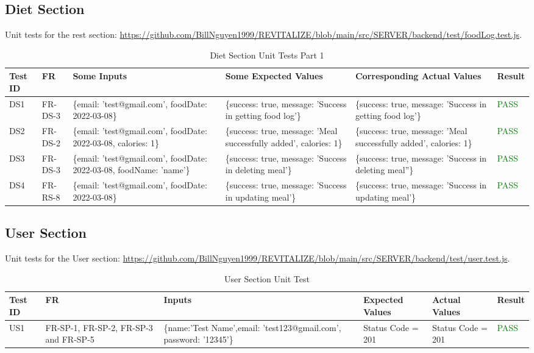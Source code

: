 \documentclass[12pt, titlepage]{article}
\begin{document}
\newpage

\subsection{Diet Section}

Unit tests for the rest section: \url{https://github.com/BillNguyen1999/REVITALIZE/blob/main/src/SERVER/backend/test/foodLog.test.js}.

\begin{table}[h]
\centering
\small
\begin{tabularx}{\textwidth}{|X|X|p{3cm}|p{2.5cm}|p{2.5cm}|X|}
	\hline
	Test ID & FR & Some Inputs & Some Expected Values & Corresponding Actual Values & Result \\
	\hline
	DS1 & FR-DS-3 & \{email: 'test@gmail.com', foodDate: 2022-03-08\}  & \{success: true, message: 'Success in getting food log'\} & \{success: true, message: 'Success in getting food log'\} & \textcolor{Green}{PASS} \\
	\hline
	DS2 & FR-DS-2 & \{email: 'test@gmail.com', foodDate: 2022-03-08, calories: 1\}  & \{success: true, message: 'Meal successfully added', calories: 1\} & \{success: true, message: 'Meal successfully added', calories: 1\} & \textcolor{Green}{PASS} \\
	\hline
	DS3 & FR-DS-3 & \{email: 'test@gmail.com', foodDate: 2022-03-08, foodName: 'name'\}  & \{success: true, message: 'Success in deleting meal'\} & \{success: true, message: 'Success in deleting meal''\} & \textcolor{Green}{PASS} \\
	\hline
	DS4 & FR-RS-8 & \{email: 'test@gmail.com', foodDate: 2022-03-08\}  & \{success: true, message: 'Success in updating meal'\} & \{success: true, message: 'Success in updating meal'\} & \textcolor{Green}{PASS} \\
	\hline
\end{tabularx}
\caption{Diet Section Unit Tests Part 1}
\label{table:diet-unit-tests}
\end{table}

\newpage

\subsection{User Section}

Unit tests for the User section: \url{https://github.com/BillNguyen1999/REVITALIZE/blob/main/src/SERVER/backend/test/user.test.js}.
\begin{table}[h]
\centering
\small
\begin{tabularx}{\textwidth}{|X|X|p{3cm}|p{2.5cm}|p{2.5cm}|X|}
	\hline
	Test ID & FR & Inputs & Expected Values & Actual Values & Result \\
	\hline
	US1 & FR-SP-1, FR-SP-2, FR-SP-3 and FR-SP-5  & \{name:'Test Name',email: 'test123@gmail.com', password: '12345'\}  & Status Code = 201 & Status Code = 201 & \textcolor{Green}{PASS} \\
	\hline
	
\end{tabularx}
\caption{User Section Unit Test}
\label{table:workout-unit-tests}
\end{table}
\end{document}

